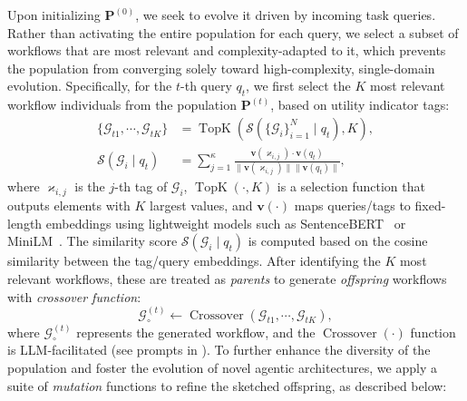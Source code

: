 \documentclass{article}
\theoremstyle{plain}
\theoremstyle{definition}
\theoremstyle{remark}
\begin{document}
Upon initializing  $\mathbf{P}^{(0)}$, we seek to evolve it driven by incoming task queries. Rather than activating the entire population for each query, we select a subset of workflows that are most relevant and complexity-adapted to it, which prevents the population from converging solely toward high-complexity, single-domain evolution.
Specifically, for the \(t\)-th query \(q_t\), we first select the \(K\) most relevant workflow individuals from the population \(\mathbf{P}^{(t)}\), based on utility indicator tags:  
\begin{equation} \label{eq:select-parent}
\begin{aligned}  
\{\mathcal{G}_{t1}, \cdots, \mathcal{G}_{tK}\} &= \operatorname{TopK}\left(\mathcal{S}(\{\mathcal{G}_i\}_{i=1}^N \;|\; q_t), K\right), \\  
\mathcal{S}(\mathcal{G}_i \;|\; q_t) & = \sum_{j=1}^\kappa \frac{\mathbf{v}(\varkappa_{i,j}) \cdot \mathbf{v}(q_t)}{\|\mathbf{v}(\varkappa_{i,j})\| \|\mathbf{v}(q_t)\|},  
\end{aligned}  
\end{equation}  
where \(\varkappa_{i,j}\) is the \(j\)-th tag of \(\mathcal{G}_i\), $\operatorname{TopK}(\cdot,K)$ is a selection function
that outputs elements with $K$ largest values, and \(\mathbf{v}(\cdot)\) maps queries/tags to fixed-length embeddings using lightweight models such as SentenceBERT~\citep{reimers2019sentence} or MiniLM~\citep{wang2020minilm}. The similarity score \(\mathcal{S}(\mathcal{G}_i \mid q_t)\) is computed based on the cosine similarity between the tag/query embeddings.  
After identifying the \(K\) most relevant workflows, these are treated as \textit{parents} to generate \textit{offspring} workflows with \textit{crossover function}:
\begin{equation}
\label{eq:crossover}
\mathcal{G}_\circ^{(t)}\leftarrow \operatorname{Crossover}(\mathcal{G}_{t1}, \cdots, \mathcal{G}_{tK}),
\end{equation}
where \(\mathcal{G}_\circ^{(t)}\) represents the generated workflow, and the \(\operatorname{Crossover}(\cdot)\) function is LLM-facilitated (see prompts in ).  
To further enhance the diversity of the population and foster the evolution of novel agentic architectures, we apply a suite of \textit{mutation} functions to refine the sketched offspring, as described below:  
\end{document}
